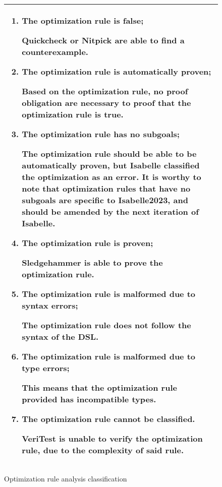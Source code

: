 \begin{figure}[!htb]
    \begin{tabular}{|L{0.95\textwidth}|}
          \hline
          \begin{enumerate}
                \item The optimization rule is false;
                
                    Quickcheck or Nitpick are able to find a counterexample.
            
                \item The optimization rule is automatically proven;
                
                    Based on the optimization rule, no proof obligation are necessary to proof that the optimization rule is true.  
                
                \item The optimization rule has no subgoals;
                
                    The optimization rule should be able to be automatically proven, but Isabelle classified the optimization as an error.
                    It is worthy to note that optimization rules that have no subgoals are specific to Isabelle2023, and 
                    should be amended by the next iteration of Isabelle.
                
                \item The optimization rule is proven;
                
                    Sledgehammer is able to prove the optimization rule.
                
                \item The optimization rule is malformed due to syntax errors;
                
                    The optimization rule does not follow the syntax of the DSL.

                \item The optimization rule is malformed due to type errors;
                
                    This means that the optimization rule provided has incompatible types.
            
                \item The optimization rule cannot be classified.
                      
                    VeriTest is unable to verify the optimization rule, due to the complexity of said rule.
          \end{enumerate} \\
          \hline
    \end{tabular}
    \caption{Optimization rule analysis classification}
    \label{fig:analysisClassification}
\end{figure}

